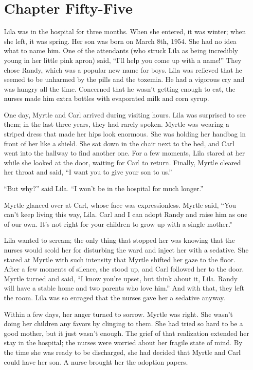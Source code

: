 \documentclass[
  letterpaper,
]{book}
\begin{document}

\chapter{Chapter Fifty-Five}\label{chapter-fifty-five}

Lila was in the hospital for three months. When she entered, it was
winter; when she left, it was spring. Her son was born on March 8th,
1954. She had no idea what to name him. One of the attendants (who
struck Lila as being incredibly young in her little pink apron) said,
``I'll help you come up with a name!'' They chose Randy, which was a
popular new name for boys. Lila was relieved that he seemed to be
unharmed by the pills and the toxemia. He had a vigorous cry and was
hungry all the time. Concerned that he wasn't getting enough to eat, the
nurses made him extra bottles with evaporated milk and corn syrup.

One day, Myrtle and Carl arrived during visiting hours. Lila was
surprised to see them; in the last three years, they had rarely spoken.
Myrtle was wearing a striped dress that made her hips look enormous. She
was holding her handbag in front of her like a shield. She sat down in
the chair next to the bed, and Carl went into the hallway to find
another one. For a few moments, Lila stared at her while she looked at
the door, waiting for Carl to return. Finally, Myrtle cleared her throat
and said, ``I want you to give your son to us.''

``But why?'' said Lila. ``I won't be in the hospital for much longer.''

Myrtle glanced over at Carl, whose face was expressionless. Myrtle said,
``You can't keep living this way, Lila. Carl and I can adopt Randy and
raise him as one of our own. It's not right for your children to grow up
with a single mother.''

Lila wanted to scream; the only thing that stopped her was knowing that
the nurses would scold her for disturbing the ward and inject her with a
sedative. She stared at Myrtle with such intensity that Myrtle shifted
her gaze to the floor. After a few moments of silence, she stood up, and
Carl followed her to the door. Myrtle turned and said, ``I know you're
upset, but think about it, Lila. Randy will have a stable home and two
parents who love him.'' And with that, they left the room. Lila was so
enraged that the nurses gave her a sedative anyway.

Within a few days, her anger turned to sorrow. Myrtle was right. She
wasn't doing her children any favors by clinging to them. She had tried
so hard to be a good mother, but it just wasn't enough. The grief of
that realization extended her stay in the hospital; the nurses were
worried about her fragile state of mind. By the time she was ready to be
discharged, she had decided that Myrtle and Carl could have her son. A
nurse brought her the adoption papers.
\end{document}
